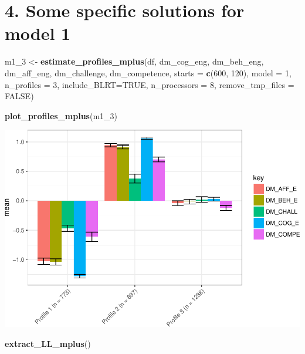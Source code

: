 \documentclass[]{book}
\newenvironment{Shaded}{\begin{snugshade}}{\end{snugshade}}
\newcommand{\KeywordTok}[1]{\textcolor[rgb]{0.13,0.29,0.53}{\textbf{#1}}}
\newcommand{\DataTypeTok}[1]{\textcolor[rgb]{0.13,0.29,0.53}{#1}}
\newcommand{\DecValTok}[1]{\textcolor[rgb]{0.00,0.00,0.81}{#1}}
\newcommand{\StringTok}[1]{\textcolor[rgb]{0.31,0.60,0.02}{#1}}
\newcommand{\OtherTok}[1]{\textcolor[rgb]{0.56,0.35,0.01}{#1}}
\newcommand{\NormalTok}[1]{#1}
\begin{document}
\section{4. Some specific solutions for model
1}\label{some-specific-solutions-for-model-1}

\begin{Shaded}
\begin{Highlighting}[]
\NormalTok{m1_}\DecValTok{3}\NormalTok{ <-}\StringTok{ }\KeywordTok{estimate_profiles_mplus}\NormalTok{(df,  }
\NormalTok{                             dm_cog_eng, dm_beh_eng, dm_aff_eng, dm_challenge, dm_competence,}
                             \DataTypeTok{starts =} \KeywordTok{c}\NormalTok{(}\DecValTok{600}\NormalTok{, }\DecValTok{120}\NormalTok{),}
                             \DataTypeTok{model =} \DecValTok{1}\NormalTok{,}
                             \DataTypeTok{n_profiles =} \DecValTok{3}\NormalTok{,}
                             \DataTypeTok{include_BLRT=}\OtherTok{TRUE}\NormalTok{,}
                             \DataTypeTok{n_processors =} \DecValTok{8}\NormalTok{, }\DataTypeTok{remove_tmp_files =} \OtherTok{FALSE}\NormalTok{)}

\KeywordTok{plot_profiles_mplus}\NormalTok{(m1_}\DecValTok{3}\NormalTok{)}
\end{Highlighting}
\end{Shaded}

\includegraphics{rosenberg-dissertation_files/figure-latex/spec-solutions-model1-1.pdf}

\begin{Shaded}
\begin{Highlighting}[]
\KeywordTok{extract_LL_mplus}\NormalTok{()}
\end{Highlighting}
\end{Shaded}
\end{document}
